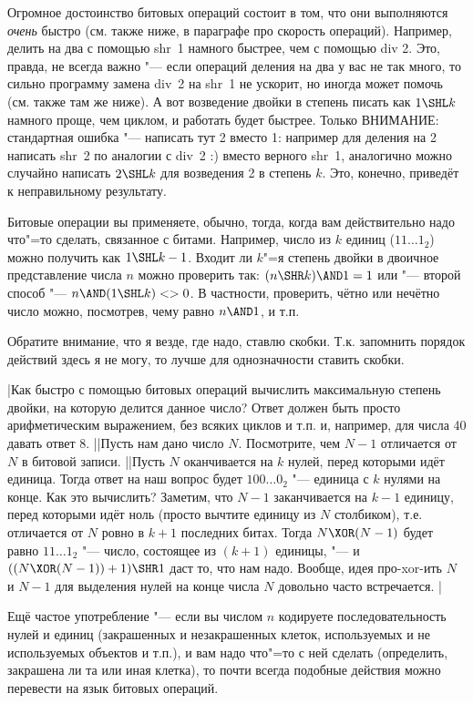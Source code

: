 Огромное достоинство битовых операций состоит в том, что они выполняются \textit{очень} быстро (см.
также ниже, в параграфе про скорость операций). Например, делить на два с помощью shr~1 намного 
быстрее, чем с помощью div 2. Это, правда, не всегда важно "--- если операций деления на два у вас 
не так много, то сильно программу замена div~2 на shr~1 не ускорит, но иногда может помочь (см. также там же ниже). А вот возведение 
двойки в степень писать как $1\SHL k$ намного проще, чем циклом, и работать будет быстрее. Только 
ВНИМАНИЕ: стандартная ошибка "--- написать тут 2 вместо 1: например для деления на 2 написать 
shr~2 по аналогии с div~2 :) вместо верного shr~1, аналогично можно случайно написать $2\SHL k$ для 
возведения 2 в степень $k$. Это, конечно, приведёт к неправильному результату.

Битовые операции вы применяете, обычно, тогда, когда вам действительно надо что"=то сделать, 
связанное с битами. Например, число из $k$ единиц ($11\dots1_2$) можно получить как $1\SHL k-1$. 
Входит ли $k$"=я степень двойки в двоичное представление числа $n$ можно проверить так: $(n \SHR k) 
\AND 1=1$ или "--- второй способ "--- $n \AND (1 \SHL k)<>0$. В частности, проверить, чётно или нечётно число можно, 
посмотрев, чему равно $n \AND 1$, и т.п.

Обратите внимание, что я везде, где надо, ставлю скобки. Т.к. запомнить порядок действий здесь я не 
могу, то лучше для однозначности ставить скобки.

\task|Как быстро с помощью битовых операций вычислить максимальную степень двойки, на 
которую делится данное число? Ответ должен быть просто арифметическим выражением, без всяких циклов 
и т.п. и, например, для числа 40 давать ответ 8.
||Пусть нам дано число $N$. Посмотрите, чем $N-1$ отличается от $N$ в битовой записи.
||Пусть $N$ оканчивается на $k$ нулей, перед которыми идёт единица. Тогда ответ на наш вопрос будет $100\dots0_2$ "--- единица с $k$ нулями на конце. Как это вычислить? Заметим, что $N-1$ заканчивается на $k-1$ единицу, перед которыми идёт ноль (просто вычтите единицу из $N$ столбиком), т.е. отличается от $N$ ровно в $k+1$ последних битах. Тогда $N \XOR (N-1)$ будет равно $11\dots1_2$ "--- число, состоящее из $(k+1)$ единицы, "--- и $((N \XOR (N-1)) +1) \SHR 1$ даст то, что нам надо. Вообще, идея про-xor-ить $N$ и $N-1$ для выделения нулей на конце числа $N$ довольно часто встречается.
|

Ещё частое употребление "--- если вы числом $n$ кодируете последовательность нулей и единиц 
(закрашенных и незакрашенных клеток, используемых и не используемых объектов и т.п.), и вам надо 
что"=то с ней сделать (определить, закрашена ли та или иная клетка), то почти всегда подобные действия можно перевести на язык битовых операций.